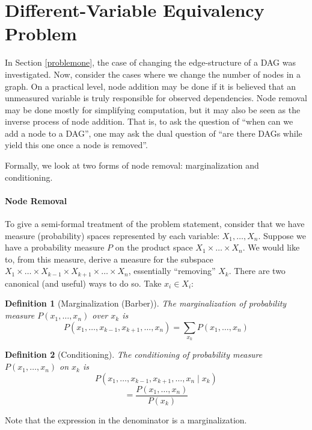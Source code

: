 \documentclass{article}
\newtheorem{definition}{Definition}
\newcommand{\problemtwo}{Different-Variable Equivalency Problem}
\begin{document}
	\section{\problemtwo}
	\label{problemtwo}
	In Section \ref{problemone}, the case of changing the edge-structure of a DAG was investigated.
	Now, consider the cases where we change the number of nodes in a graph.
	On a practical level, node addition may be done if it is believed that an unmeasured variable is truly responsible for observed dependencies.
	Node removal may be done mostly for simplifying computation, but it may also be seen as the inverse process of node addition.
	That is, to ask the question of ``when can we add a node to a DAG'', one may ask the dual question of ``are there DAGs while yield this one once a node is removed''.
	
	Formally, we look at two forms of node removal: marginalization and conditioning.
	
	\paragraph{Node Removal}
	
	To give a semi-formal treatment of the problem statement, consider that we have measure (probability) spaces represented by each variable: $X_1, \dots, X_n$.
	Suppose we have a probability measure $P$ on the product space $X_1 \times \dots \times X_n$.
	We would like to, from this measure, derive a measure for the subspace $X_1 \times \dots \times X_{k-1} \times X_{k+1} \times \dots \times X_n$, essentially ``removing'' $X_k$.
	There are two canonical (and useful) ways to do so.
	Take $x_i \in X_i$:
	
	\begin{definition}[Marginalization (Barber)\cite{barberBRML2012}]
		The marginalization of probability measure $P(x_1, \dots, x_n)$ over $x_k$ is
		$$
		P(x_1,\dots,x_{k-1},x_{k+1},\dots,x_n) = \sum_{x_k}{P(x_1,\dots,x_n)}
		$$
	\end{definition}

	\begin{definition}[Conditioning]
		The conditioning of probability measure $P(x_1, \dots, x_n)$ on $x_k$ is
		$$
		P(x_1,\dots,x_{k-1},x_{k+1},\dots,x_n \mid x_k)$$
		$$ = \frac{P(x_1,\dots,x_n)}{P(x_k)}
		$$
	\end{definition}
	Note that the expression in the denominator is a marginalization.
	
\end{document}
